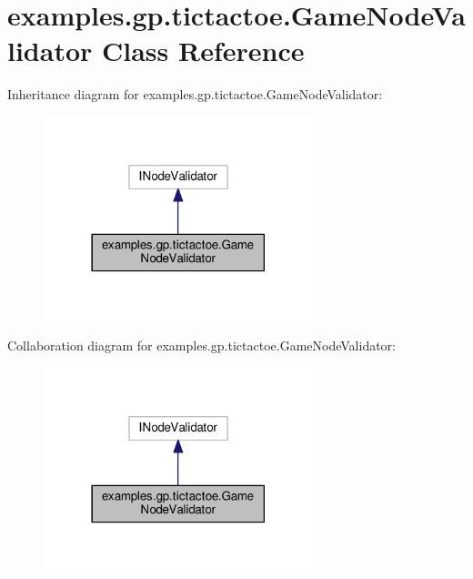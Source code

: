 \hypertarget{classexamples_1_1gp_1_1tictactoe_1_1_game_node_validator}{\section{examples.\-gp.\-tictactoe.\-Game\-Node\-Validator Class Reference}
\label{classexamples_1_1gp_1_1tictactoe_1_1_game_node_validator}
}


Inheritance diagram for examples.\-gp.\-tictactoe.\-Game\-Node\-Validator\-:
\nopagebreak
\begin{figure}[H]
\begin{center}
\leavevmode
\includegraphics[width=222pt]{classexamples_1_1gp_1_1tictactoe_1_1_game_node_validator__inherit__graph}
\end{center}
\end{figure}


Collaboration diagram for examples.\-gp.\-tictactoe.\-Game\-Node\-Validator\-:
\nopagebreak
\begin{figure}[H]
\begin{center}
\leavevmode
\includegraphics[width=222pt]{classexamples_1_1gp_1_1tictactoe_1_1_game_node_validator__coll__graph}
\end{center}
\end{figure}
